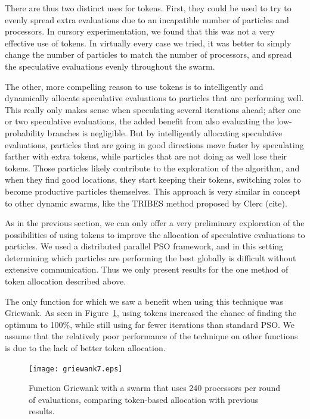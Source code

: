\documentclass[journal,letterpaper]{IEEEtran}
\newcommand{\fig}[1]{Figure~\ref{fig:#1}}
\begin{document}
There are thus two distinct uses for tokens.  First, they could be used to try
to evenly spread extra evaluations due to an incapatible number of particles
and processors.  In cursory experimentation, we found that this was not a very
effective use of tokens.  In virtually every case we tried, it was better to
simply change the number of particles to match the number of processors, and 
spread the speculative evaluations evenly throughout the swarm.

The other, more compelling reason to use tokens is to intelligently and
dynamically allocate speculative evaluations to particles that are performing
well.  This really only makes sense when speculating several iterations ahead;
after one or two speculative evaluations, the added benefit from also
evaluating the low-probability branches is negligible.  But by intelligently
allocating speculative evaluations, particles that are going in good directions
move faster by speculating farther with extra tokens, while particles that are
not doing as well lose their tokens.  Those particles likely contribute to the
exploration of the algorithm, and when they find good locations, they start
keeping their tokens, switching roles to become productive particles
themselves.  This approach is very similar in concept to other dynamic swarms,
like the TRIBES method proposed by Clerc (cite).

As in the previous section, we can only offer a very preliminary exploration of
the possibilities of using tokens to improve the allocation of speculative
evaluations to particles.  We used a distributed parallel PSO framework, and in
this setting determining which particles are performing the best globally is
difficult without extensive communication.  Thus we only present results for
the one method of token allocation described above.  

The only function for which we saw a benefit when using this technique was
Griewank.  As seen in \fig{griewank-token}, using tokens increased the chance
of finding the optimum to 100\%, while still using far fewer iterations than
standard PSO.  We assume that the relatively poor performance of the technique
on other functions is due to the lack of better token allocation.

\begin{figure}
  \centering
  \texttt{[image: griewank7.eps]}
  \caption{Function Griewank with a swarm that uses 240 processors per round of
  evaluations, comparing token-based allocation with previous results.}
  \label{fig:griewank-token}
\end{figure}
\end{document}
